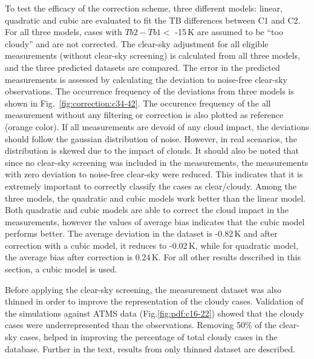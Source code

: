 \documentclass[12pt]{article}
\begin{document}
To test the efficacy of the correction scheme, three different models: linear,
quadratic and cubic are evaluated to fit the TB differences between C1 and C2.
For all three models, cases with $Tb2-Tb1 < $ -15\,K are assumed to be ``too
cloudy'' and are not corrected. The clear-sky adjustment for all eligible
measurements (without clear-sky screening) is calculated from all three models,
and the three predicted datasets are compared. The error in the predicted
measurements is assessed by calculating the deviation to noise-free clear-sky
observations. The occurrence frequency of the deviations from three models is
shown in Fig.~\ref{fig:correction:c34-42}. The occurence frequency of the all
measurement without any filtering or correction is also plotted as reference
(orange color). If all measurements are devoid of any cloud impact, the
deviations should follow the gaussian distribution of noise. However, in real
scenarios, the distribution is skewed due to the impact of clouds. It should
also be noted that since no clear-sky screening was included in the
measurements, the measurements with zero deviation to noise-free clear-sky were
reduced. This indicates that it is extremely important to correctly classify
the cases as clear/cloudy. Among the three models, the quadratic and cubic
models work better than the linear model. Both quadratic and cubic models are
able to correct the cloud impact in the measurements, however the values of
average bias indicates that the cubic model performs better. The average
deviation in the dataset is -0.82\,K and after correction with a cubic model,
it reduces to -0.02\,K, while for quadratic model, the average bias after
correction is 0.24\,K. For all other results described in this section, a cubic
model is used.


Before applying the clear-sky screening, the measurement dataset was also
thinned in order to improve the representation of the cloudy cases. Validation
of the simulations against ATMS data (Fig.\ref{fig:pdf:c16-22}) showed that the
cloudy cases were underrepresented than the observations. Removing 50\% of the
clear-sky cases, helped in improving the percentage of total cloudy cases in
the database. Further in the text, results from only thinned dataset are
described.
\end{document}
